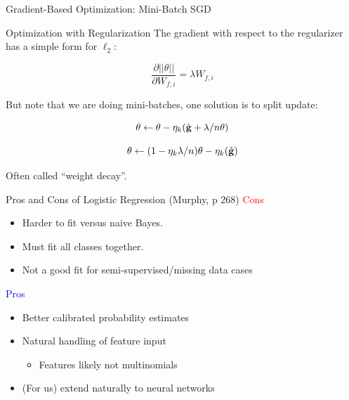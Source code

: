 \documentclass{beamer}
\begin{document}
\begin{frame}{Gradient-Based Optimization: Mini-Batch SGD}
  \begin{figure}
    \begin{algorithmic}
      \EndFor{}
      \EndWhile{}
      \State{\Return{$\theta$}}
    \end{algorithmic}
  \end{figure}  
\end{frame}


\begin{frame}{Optimization with Regularization}
  The gradient with respect to the regularizer has a simple form for $\ell_2$:

  \[ \frac{\partial ||\theta||}{\partial W_{f, i}} = \lambda  W_{f, i}\]

  But note that we are doing mini-batches, one solution is to split update:

  \[\theta \gets \theta - \eta_k (\hat{\mathbf{g}} + \lambda/n \theta) \] 


  \[\theta \gets  (1 -\eta_k \lambda/n) \theta -  \eta_k (\hat{\mathbf{g}}) \] 


  Often called ``weight decay''.

\end{frame}


\begin{frame}{Pros and Cons of Logistic Regression (Murphy, p 268)}
  \textcolor{red}{Cons}
  \begin{itemize}
  \item Harder to fit versus naive Bayes.
  \item Must fit all classes together.
  \item Not a good fit for semi-supervised/missing data cases

  \end{itemize}
  \textcolor{blue}{Pros}
  \begin{itemize}
  \item Better calibrated probability estimates
  \item Natural handling of feature input 
 
    \begin{itemize}
    \item Features likely not multinomials
    \end{itemize}

  \item (For us) extend naturally to neural networks 
  \end{itemize}
\end{frame}
\end{document}

